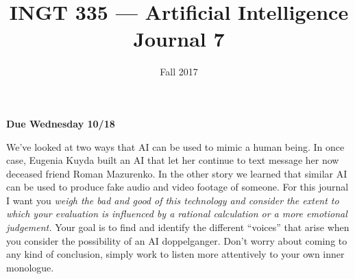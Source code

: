 \documentclass[nobib]{tufte-handout}
\title{INGT 335 --- Artificial Intelligence \\ Journal 7}
\author{}
\date{ Fall 2017 }
\begin{document}
\maketitle

\begin{center}
  \textbf{Due Wednesday 10/18}
\end{center}

We've looked at two ways that AI can be used to mimic a human being. In once case, Eugenia Kuyda built an AI that let her continue to text message her now deceased friend Roman Mazurenko.  In the other story we learned that similar AI can be used to produce fake audio and video footage of someone. For this journal I want you \textit{weigh the bad and good of this technology and consider the extent to which your evaluation is influenced by a rational calculation or a more emotional judgement.}  Your goal is to find and identify the different ``voices'' that arise when you consider the possibility of an AI doppelganger.  Don't worry about coming to any kind of conclusion, simply work to listen more attentively to your own inner monologue. 
\end{document}
